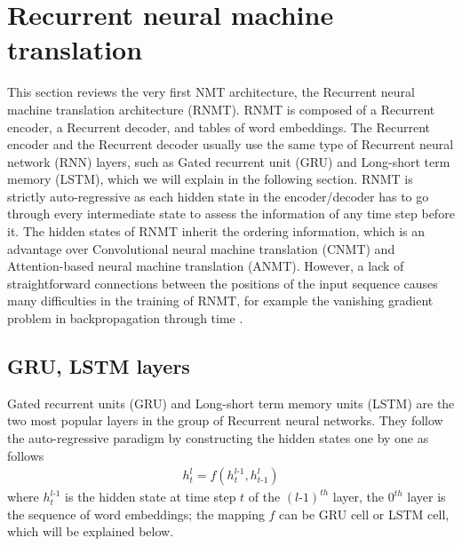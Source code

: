 \section{Recurrent neural machine translation} \label{sec:rrn}
This section reviews the very first NMT architecture, the Recurrent neural machine translation architecture (RNMT). RNMT is composed of a Recurrent encoder, a Recurrent decoder, and tables of word embeddings. The Recurrent encoder and the Recurrent decoder usually use the same type of Recurrent neural network (RNN) layers, such as Gated recurrent unit (GRU) and Long-short term memory (LSTM), which we will explain in the following section. RNMT is strictly auto-regressive as each hidden state in the encoder/decoder has to go through every intermediate state to assess the information of any time step before it. The hidden states of RNMT inherit the ordering information, which is an advantage over Convolutional neural machine translation (CNMT) and Attention-based neural machine translation (ANMT). However, a lack of straightforward connections between the positions of the input sequence causes many difficulties in the training of RNMT, for example the vanishing gradient problem in backpropagation through time \citet{Pascanu13onthe}.

\subsection{GRU, LSTM layers}
Gated recurrent units (GRU) and Long-short term memory units (LSTM) are the two most popular layers in the group of Recurrent neural networks. They follow the auto-regressive paradigm by constructing the hidden states one by one as follows
\begin{equation}
\begin{array}{rcl}
h^l_t = f(h^{l\text{-}1}_t, h^l_{t\text{-}1})
\end{array}
\end{equation}
where $h^{l\text{-}1}_t$ is the hidden state at time step $t$ of the $(l\text{-}1)^{th}$ layer, the $0^{th}$ layer is the sequence of word embeddings; the mapping $f$ can be GRU cell or LSTM cell, which will be explained below.

